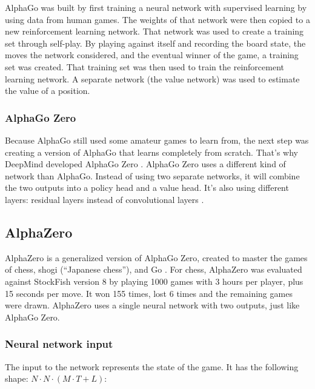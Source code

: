 \documentclass{article}
\begin{document}
AlphaGo was built \cite{AlphaGo} \cite{MasteringGameGo}  by first training a neural network with supervised learning by using data from human games.
The weights of that network were then copied to a new reinforcement learning network. That network was used to 
create a training set through self-play. By playing against itself and recording the board state, the 
moves the network considered, and the eventual winner of the game, a training set was created.
That training set was then used to train the reinforcement learning network. A separate network (the value network) 
was used to estimate the value of a position. 

\subsubsection{AlphaGo Zero}

Because AlphaGo still used some amateur games to learn from, the next step was creating a version of AlphaGo
that learns completely from scratch. That's why DeepMind developed AlphaGo Zero \cite{AlphaGoZero2022}.
AlphaGo Zero uses a different kind of network than AlphaGo. Instead of using two separate networks, 
it will combine the two outputs into a policy head and a value head. It's also using different layers:
residual layers instead of convolutional layers \cite{MasteringGameZero}. 

\subsection{AlphaZero}

AlphaZero is a generalized version of AlphaGo Zero, created to master the games of chess, shogi (``Japanese chess''), and Go \cite{AlphaZero2022} \cite{silverMasteringChessShogi2017c}. 
For chess, AlphaZero was evaluated against StockFish version 8 by playing 1000 games with 3 hours per player, plus 
15 seconds per move. It won 155 times, lost 6 times and the remaining games were drawn. 
AlphaZero uses a single neural network with two outputs, just like AlphaGo Zero. 


\subsubsection{Neural network input}

The input to the network represents the state of the game. 
It has the following shape: $N \cdot N \cdot (M \cdot T + L)$:
\end{document}

